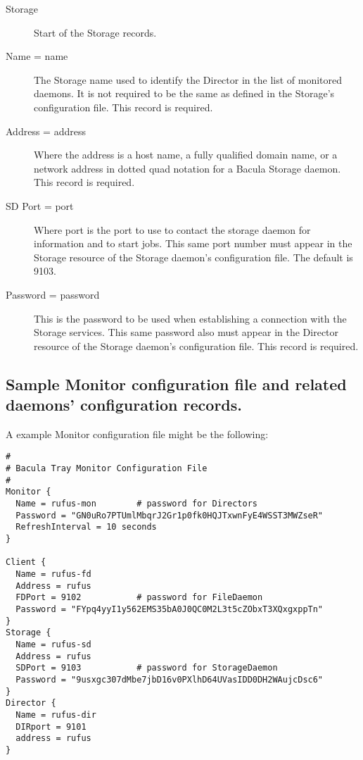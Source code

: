 \begin{description}

\item [Storage]
   Start of the Storage records. 

\item [Name = \lt{}name\gt{}]
   The Storage name used to identify  the Director in the list of monitored
daemons. It is not required  to be the same as defined in the Storage's
configuration file.  This record is required. 

\item [Address = \lt{}address\gt{}]
   Where the address is a host  name, a fully qualified domain name, or a network
address in  dotted quad notation for a Bacula Storage daemon.  This record is
required. 

\item [SD Port = \lt{}port\gt{}]
   Where port is the port to use to  contact the storage daemon for information
and to start jobs.  This same port number must appear in the Storage resource
of the  Storage daemon's configuration file. The default is 9103. 

\item [Password = \lt{}password\gt{}]
   This is the password to be used  when establishing a connection with the
Storage services. This  same password also must appear in the Director
resource of the Storage  daemon's configuration file. This record is required.

\end{description}

\subsection*{Sample Monitor configuration file and related daemons'
configuration records.}
\label{SampleConfiguration1}

A example Monitor configuration file might be the following: 

\footnotesize
\begin{verbatim}
#
# Bacula Tray Monitor Configuration File
#
Monitor {
  Name = rufus-mon        # password for Directors
  Password = "GN0uRo7PTUmlMbqrJ2Gr1p0fk0HQJTxwnFyE4WSST3MWZseR"
  RefreshInterval = 10 seconds
}
   
Client {
  Name = rufus-fd
  Address = rufus
  FDPort = 9102           # password for FileDaemon
  Password = "FYpq4yyI1y562EMS35bA0J0QC0M2L3t5cZObxT3XQxgxppTn"
}
Storage {
  Name = rufus-sd
  Address = rufus
  SDPort = 9103           # password for StorageDaemon
  Password = "9usxgc307dMbe7jbD16v0PXlhD64UVasIDD0DH2WAujcDsc6"
}
Director {
  Name = rufus-dir
  DIRport = 9101
  address = rufus
}
\end{verbatim}
\normalsize

